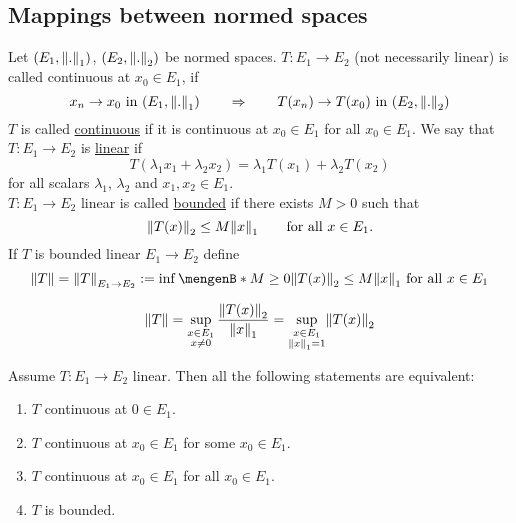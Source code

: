 \subsection{Mappings between normed spaces} 
\label{sub:mappings_between_normed_spaces}
\begin{definition*}
	Let $(E_1,\norm{.}_1)$, $(E_2,\norm{.}_2)$ be normed spaces. $T: E_1 \to E_2$ (not necessarily linear) is called continuous at $x_0 \in E_1$, if 
	\[
		x_n \to x_0 \text{ in } (E_1,\norm{.}_1) \qquad \Rightarrow \qquad T(x_n) \to T(x_0) \text{ in } (E_2,\norm{.}_2)
	\]
	$T$ is called \underline{continuous} if it is continuous at $x_0 \in E_1$ for all $x_0 \in E_1$. We say that $T: E_1 \to E_2$ is \underline{linear} if 
	\[
		T(\lambda_1 x_1 + \lambda_2 x_2) = \lambda_1 T(x_1) + \lambda_2 T(x_2)
	\]
	for all scalars $\lambda_1$, $\lambda_2$ and $x_1,x_2 \in E_1$. \\
	$T: E_1 \to E_2$ linear is called \underline{bounded} if there exists $M>0$ such that
	\[
		\norm{T(x)}_2 \leq M \norm{x}_1 \qquad \text{for all }x \in E_1.
	\]If $T$ is bounded linear $E_1 \to E_2$ define
	\[
		\norm{T} = \norm{T}_{E_1 \to E_2} := \inf \set[M \geq 0]{\norm{T(x)}_2 \leq M \norm{x}_1 \text{ for all }x \in E_1}
	\]
\end{definition*}
\begin{lemma*}
	\[
		\norm{T} = \sup\limits_{\substack{x \in E_1 \\ x \neq 0}} \frac{\norm{T(x)}_2}{\norm{x}_1} = \sup\limits_{\substack{x \in E_1 \\ \norm{x}_1=1}} \norm{T(x)}_2
	\]
\end{lemma*}
\begin{proposition*}
	Assume $T: E_1 \to E_2$ linear. Then all the following statements are equivalent:
	\begin{enumerate}[(1)]
		\item $T$ continuous at $0 \in E_1$.
		\item $T$ continuous at $x_0 \in E_1$ for some $x_0 \in E_1$.
		\item $T$ continuous at $x_0 \in E_1$ for all $x_0 \in E_1$.
		\item $T$ is bounded.
	\end{enumerate}
\end{proposition*}
